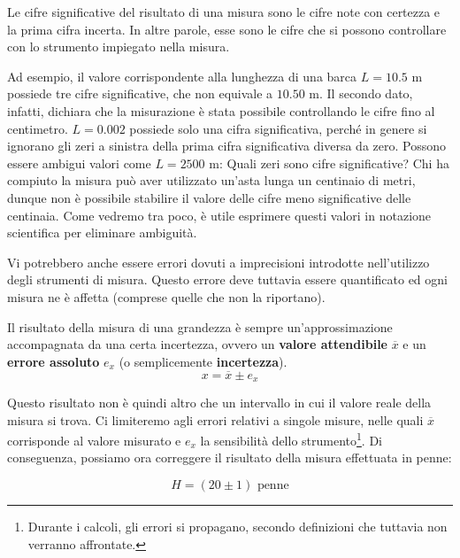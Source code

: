 \begin{tcolorbox}[colback = yellow!30, colframe = yellow!30!black, title = {Cifre significative del risultato di una misura}]
Le cifre significative del risultato di una misura sono le cifre note
con certezza e la prima cifra incerta. In altre parole, esse sono le cifre che si
possono controllare con lo strumento impiegato nella misura.
\end{tcolorbox}

\noindent Ad esempio, il valore corrispondente alla lunghezza di una barca $L = 10.5$ m
possiede tre cifre significative, che non equivale a $10.50$ m. Il secondo dato,
infatti, dichiara che la misurazione è stata possibile controllando le cifre
fino al centimetro. $L = 0.002$ possiede solo una cifra significativa, perché
in genere si ignorano gli zeri a sinistra della prima cifra significativa diversa
da zero. Possono essere ambigui valori come $L = 2500 \text{ m}$: Quali zeri sono
cifre significative? Chi ha compiuto la misura può aver utilizzato un'asta lunga
un centinaio di metri, dunque non è possibile stabilire il valore delle cifre
meno significative delle centinaia. Come vedremo tra poco, è utile esprimere questi valori in
notazione scientifica per eliminare ambiguità.

Vi potrebbero anche essere errori dovuti a imprecisioni introdotte nell'utilizzo
degli strumenti di misura. Questo errore deve tuttavia essere quantificato ed ogni
misura ne è affetta (comprese quelle che non la riportano).

\begin{tcolorbox}[colback = yellow!30, colframe = yellow!30!black, title = {Risultato della misura di una grandezza}]
Il risultato della misura di una grandezza è sempre un'approssimazione
accompagnata da una certa incertezza, ovvero un \textbf{valore attendibile} $\overline{x}$
e un \textbf{errore assoluto} $e_x$ (o semplicemente \textbf{incertezza}).
\[ x = \overline{x} \pm e_x  \]
\end{tcolorbox}

Questo risultato non è quindi altro che un intervallo in cui il valore reale
della misura si trova. Ci limiteremo agli errori relativi a singole misure,
nelle quali $\overline{x}$ corrisponde al valore misurato e $e_x$ la sensibilità dello
strumento\footnote{Durante i calcoli, gli errori si propagano,
secondo definizioni che tuttavia non verranno affrontate.}. Di conseguenza, possiamo ora correggere il risultato della misura
effettuata in penne:

\[ H = (20 \pm 1) \text{ penne} \]

